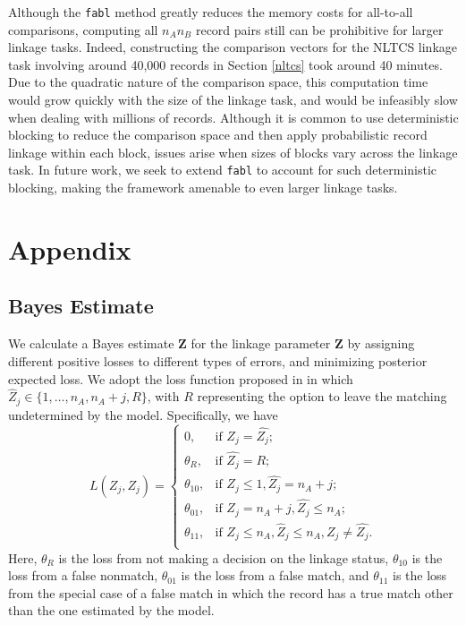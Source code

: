 \documentclass[ba]{imsart}
\begin{document}
	Although the \texttt{fabl} method greatly reduces the memory costs for all-to-all comparisons, computing all $n_A  n_B$ record pairs still can be prohibitive for larger linkage tasks. Indeed, constructing the comparison vectors for the NLTCS linkage task involving around 40,000 records in Section \ref{nltcs} took around 40 minutes. Due to the quadratic nature of the comparison space, this computation time would grow quickly with the size of the linkage task, and would be infeasibly slow when dealing with millions of records. Although it is common to use deterministic blocking to reduce the comparison space and then apply probabilistic record linkage within each block, issues arise when sizes of blocks vary across the linkage task. In future work, we seek to extend \texttt{fabl} to account for such deterministic blocking, making the framework amenable to even larger linkage tasks.

	
	\clearpage
	
	\bigskip
	
	
	
	
	\clearpage
	
	\section{Appendix}
	\label{sec:appendix}
	
	\hypertarget{bayes-estimate}{%
		\subsection{Bayes Estimate}
		\label{bayes-estimate}}
	
We calculate a Bayes estimate $\hat{\bm{Z}}$ for the linkage parameter $\bm{Z}$ by assigning different positive losses to different types of errors, and minimizing posterior expected loss. We adopt the loss function proposed in \cite{sadinle_bayesian_2017} in which $\hat{Z}_j \in \{1, \ldots, n_A, n_A + j, R\}$, with $R$ representing the option to leave the matching undetermined by the model. Specifically, we have
	\[L(\hat{Z_j}, Z_j)=\begin{cases} 
		0,  & \text{if } Z_j = \hat{Z_j}; \\
		\theta_R,  & \text{if } \hat{Z_j} = R; \\
		\theta_{10},  & \text{if } Z_j \leq 1,\hat{Z_j} = n_A + j ; \\
		\theta_{01},  & \text{if } Z_j = n_A + j,\hat{Z_j} \leq n_A ; \\
		\theta_{11},  & \text{if } Z_j \leq n_A, \hat{Z}_j \leq n_A, Z_j \neq \hat{Z_j}. \\
	\end{cases}\] 
Here, $\theta_R$ is the loss from not making a decision on the linkage status, $\theta_{10}$ is the loss from a false nonmatch, $\theta_{01}$ is the loss from a false match, and $\theta_{11}$ is the loss from the special case of a false match in which the record has a true match other than the one estimated by the model. 
\end{document}
